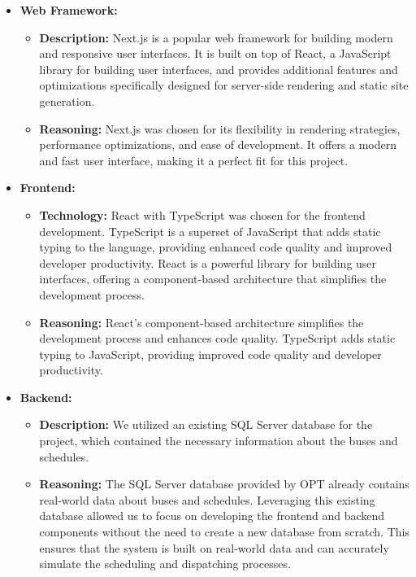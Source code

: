 \documentclass[10pt]{article}
\begin{document}
        \begin{itemize}
                \item \textbf{Web Framework:}
                \begin{itemize}
                    \item \textbf{Description:} Next.js is a popular web framework for building modern and responsive user interfaces. It is built on top of React, a JavaScript library for building user interfaces, and provides additional features and optimizations specifically designed for server-side rendering and static site generation.
                    \item \textbf{Reasoning:} Next.js was chosen for its flexibility in rendering strategies, performance optimizations, and ease of development. It offers a modern and fast user interface, making it a perfect fit for this project.
                \end{itemize}

                \item \textbf{Frontend:}
                \begin{itemize}
                    \item \textbf{Technology:} React with TypeScript was chosen for the frontend development. TypeScript is a superset of JavaScript that adds static typing to the language, providing enhanced code quality and improved developer productivity. React is a powerful library for building user interfaces, offering a component-based architecture that simplifies the development process.
                    \item \textbf{Reasoning:} React's component-based architecture simplifies the development process and enhances code quality. TypeScript adds static typing to JavaScript, providing improved code quality and developer productivity.
                \end{itemize}

                \item \textbf{Backend:}
                \begin{itemize}
                    \item \textbf{Description:} We utilized an existing SQL Server database for the project, which contained the necessary information about the buses and schedules.
                    \item \textbf{Reasoning:} The SQL Server database provided by OPT already contains real-world data about buses and schedules. Leveraging this existing database allowed us to focus on developing the frontend and backend components without the need to create a new database from scratch. This ensures that the system is built on real-world data and can accurately simulate the scheduling and dispatching processes.
                \end{itemize}


\end{itemize}
\end{document}
